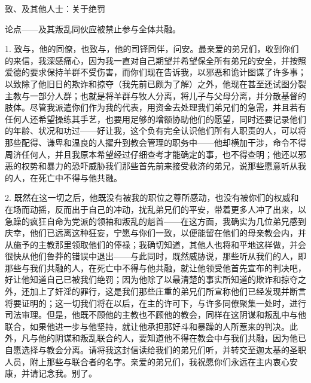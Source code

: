 致、及其他人士：关于绝罚\par

论点——及其叛乱同伙应被禁止参与全体共融。\par

1. 致与，他的同僚，也致与，他的司铎同伴，问安。最亲爱的弟兄们，收到你们的来信，我深感痛心，因为我一直对自己期望并希望保全所有弟兄的安全，并按照爱德的要求保持羊群不受伤害，而你们现在告诉我，以邪恶和诡计图谋了许多事；以致除了他旧日的欺诈和掠夺（我先前已颇为了解）之外，他现在甚至还试图分裂主教与一部分人群；也就是将羊群与牧人分离，将儿子与父母分离，并分散基督的肢体。尽管我派遣你们作为我的代表，用资金去处理我们弟兄们的急需，并且若有任何人还希望操练其手艺，也要用足够的增额协助他们的愿望，同时还要记录他们的年龄、状况和功过——好让我，这个负有完全认识他们所有人职责的人，可以将那些配得、谦卑和温良的人擢升到教会管理的职务中——他却横加干涉，命令不得周济任何人，并且我原本希望经过仔细查考才能确定的事，也不得查明；他还以邪恶的权势和暴力的恐吓威胁我们那些首先前来接受救济的弟兄，说那些愿意听从我的人，在死亡中不得与他共融。\par

2. 既然在这一切之后，他既没有被我的职位之尊所感动，也没有被你们的权威和在场而动摇，反而出于自己的冲动，扰乱弟兄们的平安，带着更多人冲了出来，以急躁的疯狂自命为党派的领袖和叛乱的魁首——在这方面，我确实为几位弟兄感到庆幸，他们已远离这种狂妄，宁愿与你们一致，以便能留在他们的母亲教会内，并从施予的主教那里领取他们的俸禄；我确切知道，其他人也将和平地这样做，并会很快从他们鲁莽的错误中退出——与此同时，既然威胁说，那些听从我们的人，即那些与我们共融的人，在死亡中不得与他共融，就让他领受他首先宣布的判决吧，好让他知道自己已被我们绝罚；因为他除了以最清楚的事实所知道的欺诈和掠夺之外，还加上了奸淫的罪行，这是我们那些庄重的弟兄们所宣称他们已经发现并断言将要证明的；这一切我们将在以后，在主的许可下，与许多同僚聚集一处时，进行司法审理。但是，他既不顾他的主教也不顾他的教会，同样在这阴谋和叛乱中与他联合，如果他进一步与他坚持，就让他承担那好斗和暴躁的人所惹来的判决。此外，凡与他的阴谋和叛乱联合的人，要知道他不得在教会中与我们共融，因为他已自愿选择与教会分离。请将我这封信读给我们的弟兄们听，并转交至迦太基的圣职人员，附上那些与联合者的名字。亲爱的弟兄们，我祝愿你们永远在主内衷心安康，并请记念我。别了。\par


